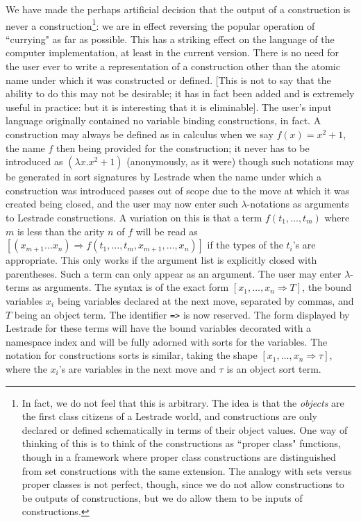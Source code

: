 \documentclass[12pt]{article}
\begin{document}
We have made the perhaps artificial decision that the output of a construction is never a construction\footnote{In fact, we do not feel that this is arbitrary.  The idea is that the {\em objects\/} are the first class citizens of a Lestrade world, and constructions are only declared or defined schematically in terms of their object values.  One way of thinking of this is to think of the constructions as ``proper class" functions, though in a framework where proper class constructions are distinguished from set constructions with the same extension.  The analogy with sets versus proper classes is  not perfect, though, since we do not allow constructions to be outputs of constructions, but we do allow them to be inputs of constructions.}:  we are in effect reversing the popular operation of ``currying" as far as possible.
This has a striking effect on the language of the computer implementation, at least in the current version.  There is no need for the user ever to write a representation of
a construction other than the atomic name under which it was constructed or defined.  [This is not to say that the ability to do this may not be desirable; it has in fact been added and is extremely useful in practice:  but it is interesting that it is eliminable].  The user's input language originally contained no variable binding constructions, in fact.   A construction may always be defined as in calculus when we say $f(x)=x^2+1$, the name $f$ then being provided for the construction; it never has to be introduced as $(\lambda x.x^2+1)$ (anonymously, as it were) though such notations may be generated in sort signatures by
Lestrade when the name under which a construction was introduced passes out of scope due to the move at which it was created being closed, and the user may now enter such $\lambda$-notations as arguments to Lestrade constructions.  A variation on this is that a term $f(t_1,\ldots,t_m)$ where $m$ is less than the arity $n$ of $f$ will be read as $[(x_{m+1}\ldots x_n) \Rightarrow f(t_1,\ldots,t_m,x_{m+1},\dots,x_n)]$ if the types of the $t_i$'s are appropriate.  This only works if the argument list is explicitly closed with parentheses.  Such a term can only appear as an argument.  The user may enter $\lambda$-terms as arguments.  The syntax is of the exact form $[x_1,\ldots,x_n \Rightarrow T]$, the bound variables $x_i$ being variables declared at the next move, separated by commas, and $T$ being an object term.  The identifier {\tt =>} is now reserved.  The form displayed by Lestrade for these terms will have the bound variables decorated with a namespace index and will be fully adorned with sorts for the variables.  The notation for constructions sorts is similar, taking the shape $[x_1,\ldots,x_n \Rightarrow \tau]$, where the $x_i$'s are variables in the next move and $\tau$ is an object sort term.
\end{document}
